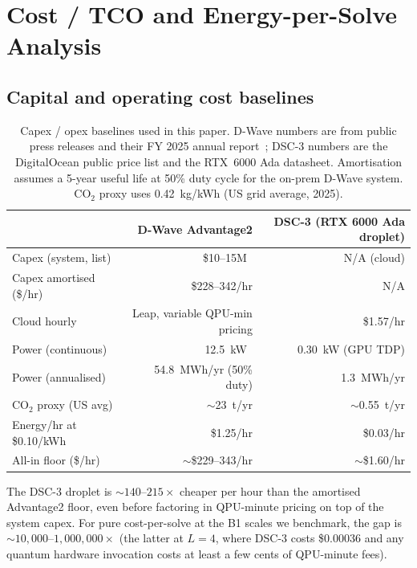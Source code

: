 \documentclass[11pt,a4paper]{article}
\begin{document}
\section{Cost / TCO and Energy-per-Solve Analysis}
\label{sec:tco}

\subsection{Capital and operating cost baselines}

\begin{table}[h]
\centering
\caption{Capex / opex baselines used in this paper. D-Wave numbers are from
public press releases and their FY 2025 annual report~\cite{dwave_q4_2025_results};
DSC-3 numbers are the DigitalOcean public price list and the RTX~6000 Ada
datasheet. Amortisation assumes a 5-year useful life at 50\% duty cycle for the
on-prem D-Wave system. CO$_2$ proxy uses 0.42~kg/kWh (US grid average, 2025).}
\label{tab:cost_baselines}
\small
\begin{tabular}{lrr}
\toprule
& D-Wave Advantage2 & DSC-3 (RTX 6000 Ada droplet) \\
\midrule
Capex (system, list) & \$10--15M~\cite{dwave_q4_2025_results} & N/A (cloud) \\
Capex amortised (\$/hr) & \$228--342/hr & N/A \\
Cloud hourly             & Leap, variable QPU-min pricing & \$1.57/hr \\
Power (continuous)       & 12.5~kW~\cite{dwave_advantage2}     & 0.30~kW (GPU TDP) \\
Power (annualised)       & 54.8~MWh/yr (50\% duty)             & 1.3~MWh/yr \\
CO$_{2}$ proxy (US avg)  & $\sim$23~t/yr                       & $\sim$0.55~t/yr \\
Energy/hr at \$0.10/kWh  & \$1.25/hr                           & \$0.03/hr \\
All-in floor (\$/hr)     & $\sim$\$229--343/hr                  & $\sim$\$1.60/hr \\
\bottomrule
\end{tabular}
\end{table}

The DSC-3 droplet is $\sim 140$--$215\times$ cheaper per hour than the
amortised Advantage2 floor, even before factoring in QPU-minute pricing
on top of the system capex. For pure cost-per-solve at the B1 scales we
benchmark, the gap is $\sim 10{,}000$--$1{,}000{,}000\times$ (the latter
at $L\!=\!4$, where DSC-3 costs \$0.00036 and any quantum hardware
invocation costs at least a few cents of QPU-minute fees).
\end{document}

